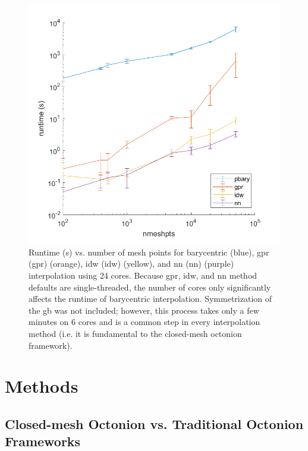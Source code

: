\documentclass[preprint,12pt]{elsarticle}
\begin{document}
\begin{figure}
    \centering
    \includegraphics{runtime.png}
    \caption{Runtime (s) vs. number of mesh points for barycentric (blue), \acrlong{gpr} (\acrshort{gpr}) (orange), \acrlong{idw} (\acrshort{idw}) (yellow), and \acrlong{nn} (\acrshort{nn}) (purple) interpolation using 24 cores. Because \acrshort{gpr}, \acrshort{idw}, and \acrshort{nn} method defaults are single-threaded, the number of cores only significantly affects the runtime of barycentric interpolation. Symmetrization of the \acrlong{gb} was not included; however, this process takes only a few minutes on 6 cores and is a common step in every interpolation method (i.e. it is fundamental to the closed-mesh octonion framework).}
    \label{fig:runtime}
\end{figure}

\section{Methods} \label{sec:methods}

\subsection{Closed-mesh Octonion vs. Traditional Octonion Frameworks} \label{sec:methods:closed-mesh-comparison}
\end{document}
